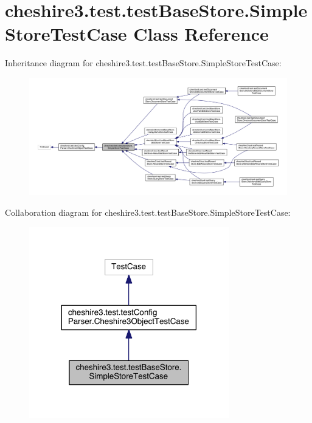 \hypertarget{classcheshire3_1_1test_1_1test_base_store_1_1_simple_store_test_case}{\section{cheshire3.\-test.\-test\-Base\-Store.\-Simple\-Store\-Test\-Case Class Reference}
\label{classcheshire3_1_1test_1_1test_base_store_1_1_simple_store_test_case}
}


Inheritance diagram for cheshire3.\-test.\-test\-Base\-Store.\-Simple\-Store\-Test\-Case\-:
\nopagebreak
\begin{figure}[H]
\begin{center}
\leavevmode
\includegraphics[width=350pt]{classcheshire3_1_1test_1_1test_base_store_1_1_simple_store_test_case__inherit__graph}
\end{center}
\end{figure}


Collaboration diagram for cheshire3.\-test.\-test\-Base\-Store.\-Simple\-Store\-Test\-Case\-:
\nopagebreak
\begin{figure}[H]
\begin{center}
\leavevmode
\includegraphics[width=246pt]{classcheshire3_1_1test_1_1test_base_store_1_1_simple_store_test_case__coll__graph}
\end{center}
\end{figure}
